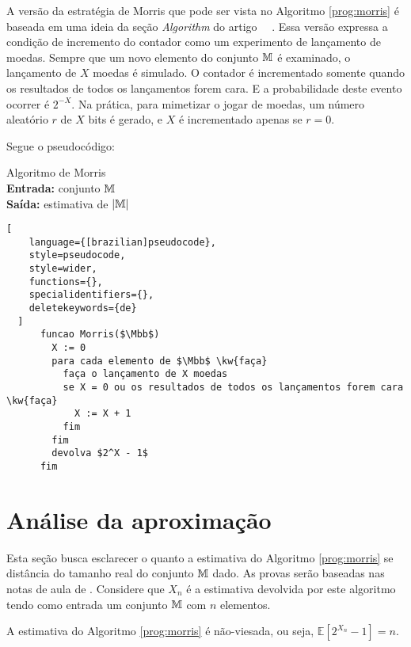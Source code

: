 A versão da estratégia de Morris que pode ser vista no Algoritmo \ref{prog:morris}
é baseada em uma ideia da seção \textit{Algorithm} do artigo ~~\citep{ApproximateCountingAlgorithm}.
Essa versão expressa a condição de incremento do contador como um experimento de lançamento de moedas. 
Sempre que um novo elemento do conjunto $\mathbb{M}$ é examinado, o lançamento de $X$ moedas é simulado. 
O contador é incrementado somente quando os resultados de todos os lançamentos forem cara.
E a probabilidade deste evento ocorrer é $2^{-X}$. Na prática, para mimetizar o jogar de moedas, 
um número aleatório $r$ de $X$ bits é gerado, e $X$ é incrementado apenas se $r = 0$.

Segue o pseudocódigo:
\begin{programruledcaption}{
Algoritmo de Morris\label{prog:morris}
\\ \textbf{Entrada:} conjunto $\mathbb{M}$
\\ \textbf{Saída:} estimativa de $|\mathbb{M}|$
\label{prog:flajolet-martin}
}
  \begin{lstlisting}[
    language={[brazilian]pseudocode},
    style=pseudocode,
    style=wider,
    functions={},
    specialidentifiers={},
    deletekeywords={de}
  ]
      funcao Morris($\Mbb$) 
        X := 0
        para cada elemento de $\Mbb$ \kw{faça}
          faça o lançamento de X moedas
          se X = 0 ou os resultados de todos os lançamentos forem cara \kw{faça}
            X := X + 1
          fim
        fim
        devolva $2^X - 1$
      fim
  \end{lstlisting}
\end{programruledcaption}

\section{Análise da aproximação}
\label{sec:morris:analysis}

Esta seção busca esclarecer o quanto a estimativa do Algoritmo \ref{prog:morris} se distância do tamanho real do conjunto $\mathbb{M}$ dado. As provas
serão baseadas nas notas de aula de \citep{LectureNotesAndoni}.
Considere que $X_n$ é a estimativa devolvida por este algoritmo tendo como entrada um conjunto $\mathbb{M}$ com $n$ elementos.

\begin{lemma} \label{morris:expected_value}
A estimativa do Algoritmo \ref{prog:morris} é não-viesada, ou seja, $\mathbb{E}[2^{X_n} - 1] = n$.
\end{lemma}

